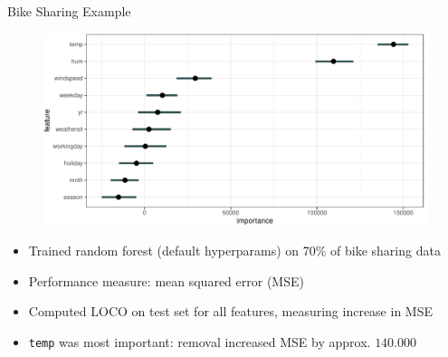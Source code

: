 \documentclass[10pt,compress,t,notes=noshow, xcolor=table]{beamer}
\begin{document}
\begin{frame}{Bike Sharing Example}
%
\begin{figure}
  \centering
  \includegraphics[width=\textwidth]{figure_man/bike_sharing_loco.pdf}
\end{figure}
%
%
\begin{itemize}
  \item Trained random forest (default hyperparams) on 70\% of bike sharing data
  \item Performance measure: mean squared error (MSE)
  \item Computed LOCO on test set for all features, measuring increase in MSE
  \item \texttt{temp} was most important: removal increased MSE by approx. $140.000$
\end{itemize}

\end{frame}
\end{document}
